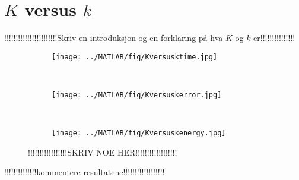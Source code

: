 \chapter{$K$ versus $k$}
!!!!!!!!!!!!!!!!!!!!!!!Skriv en introduksjon og en forklaring på hva $K$ og $k$ er!!!!!!!!!!!!!!!\\
\begin{figure}[H]
        \centering
        \begin{subfigure}[b]{0.3\textwidth}
                \texttt{[image: ../MATLAB/fig/Kversusktime.jpg]}
                \caption{  }
                \label{fig:Kversusktime}
        \end{subfigure}
        ~
        \begin{subfigure}[b]{0.3\textwidth}
                \texttt{[image: ../MATLAB/fig/Kversuskerror.jpg]}
                \caption{  }
                \label{fig:Kversuskerror}
        \end{subfigure}
        ~
        \begin{subfigure}[b]{0.3\textwidth}
                \texttt{[image: ../MATLAB/fig/Kversuskenergy.jpg]}
                \caption{  }
                \label{fig:Kversuskenergy}
        \end{subfigure}
        \caption{ !!!!!!!!!!!!!!!!!SKRIV NOE HER!!!!!!!!!!!!!!!!!!  }
        \label{fig:Kversusk}
\end{figure}
!!!!!!!!!!!!!!kommentere resultatene!!!!!!!!!!!!!!!!!!\\

